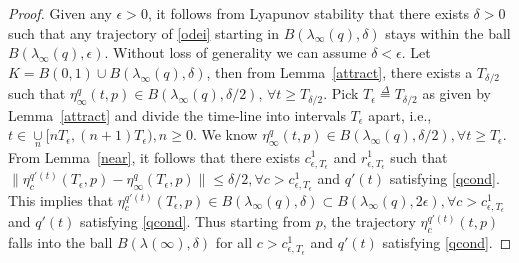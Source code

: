 \begin{proof}
Given any $\epsilon >0$, it follows from Lyapunov stability that there exists $\delta>0$ such that any 
trajectory of \eqref{odei} starting in $B(\lambda_\infty(q),\delta)$ stays within the ball 
$B(\lambda_\infty(q),\epsilon)$. Without loss of generality we can assume $\delta<\epsilon$. 
Let $K=B(0,1)\cup B(\lambda_\infty(q),\delta)$, then from Lemma~\ref{attract}, there exists a $T_{\delta/2}$ 
such that $\eta^q_\infty(t,p) \in B(\lambda_\infty(q),\delta/2)$, $\forall t\geq T_{\delta/2}$. 
Pick $T_{\epsilon}\stackrel{\Delta}{=} T_{\delta/2}$ as given by Lemma~\ref{attract} and divide the 
time-line into intervals $T_\epsilon$ apart, i.e., $t\in \underset{n}{\cup}[nT_\epsilon,(n+1)T_\epsilon), n\geq0$. We know $\eta^q_\infty(t,p) \in B(\lambda_\infty(q),\delta/2), \forall t\geq T_\epsilon$. From Lemma~\ref{near}, it follows that there exists $c^1_{\epsilon,T_\epsilon}$ and $r^1_{\epsilon,T_\epsilon}$ such that 
$\parallel \eta^{q'(t)}_c(T_\epsilon,p)-\eta^q_\infty(T_\epsilon,p)\parallel \leq \delta/2, \forall c> c^1_{\epsilon,T_\epsilon}$ and $q'(t)$ satisfying \eqref{qcond}. This implies that $\eta^{q'(t)}_c(T_\epsilon,p) \in B(\lambda_\infty(q),\delta) \subset B(\lambda_\infty(q),2\epsilon), \forall c> c^1_{\epsilon,T_\epsilon}$ and $q'(t)$ satisfying \eqref{qcond}. Thus starting from $p$, the trajectory $\eta^{q'(t)}_c(t,p)$ falls into the ball $B(\lambda(\infty),\delta)$ for all $c>c^1_{\epsilon,T_\epsilon}$ and $q'(t)$ satisfying \eqref{qcond}.


\end{proof}
